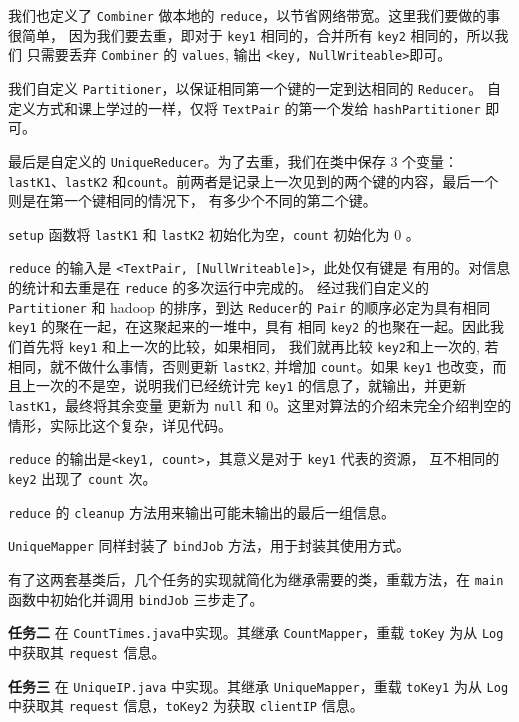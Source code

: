 \documentclass{article}
\begin{document}
  我们也定义了 \verb|Combiner| 做本地的 \verb|reduce|，以节省网络带宽。这里我们要做的事很简单，
  因为我们要去重，即对于 \verb|key1| 相同的，合并所有 \verb|key2| 相同的，所以我们
  只需要丢弃 \verb|Combiner| 的 \verb|values|, 输出 \verb|<key, NullWriteable>|即可。
  
  我们自定义 \verb|Partitioner|，以保证相同第一个键的一定到达相同的 \verb|Reducer|。
  自定义方式和课上学过的一样，仅将 \verb|TextPair| 的第一个发给 \verb|hashPartitioner| 即可。

  最后是自定义的 \verb|UniqueReducer|。为了去重，我们在类中保存 3 个变量：\verb|lastK1|、\verb|lastK2|
  和\verb|count|。前两者是记录上一次见到的两个键的内容，最后一个则是在第一个键相同的情况下，
  有多少个不同的第二个键。

  \verb|setup| 函数将 \verb|lastK1| 和 \verb|lastK2| 初始化为空，\verb|count| 初始化为 0 。

  \verb|reduce| 的输入是 \verb|<TextPair, [NullWriteable]>|，此处仅有键是
  有用的。对信息的统计和去重是在 \verb|reduce| 的多次运行中完成的。
  经过我们自定义的 \verb|Partitioner| 和 hadoop 的排序，到达 \verb|Reducer|的
  \verb|Pair| 的顺序必定为具有相同\verb|key1| 的聚在一起，在这聚起来的一堆中，具有
  相同 \verb|key2| 的也聚在一起。因此我们首先将 \verb|key1| 和上一次的比较，如果相同，
  我们就再比较 \verb|key2|和上一次的, 若相同，就不做什么事情，否则更新 \verb|lastK2|,
  并增加 \verb|count|。如果 \verb|key1| 也改变，而且上一次的不是空，说明我们已经统计完
  \verb|key1| 的信息了，就输出，并更新 \verb|lastK1|，最终将其余变量
  更新为 \verb|null| 和 0。这里对算法的介绍未完全介绍判空的情形，实际比这个复杂，详见代码。
  
  \verb|reduce| 的输出是\verb|<key1, count>|，其意义是对于 \verb|key1| 代表的资源，
  互不相同的 \verb|key2| 出现了 \verb|count| 次。

  \verb|reduce| 的 \verb|cleanup| 方法用来输出可能未输出的最后一组信息。

  \verb|UniqueMapper| 同样封装了 \verb|bindJob| 方法，用于封装其使用方式。

  有了这两套基类后，几个任务的实现就简化为继承需要的类，重载方法，在 \verb|main| 函数中初始化并调用
  \verb|bindJob| 三步走了。

  \textbf{任务二} 在 \verb|CountTimes.java|中实现。其继承 \verb|CountMapper|，重载 \verb|toKey| 为从
  \verb|Log| 中获取其 \verb|request| 信息。  
  
  \textbf{任务三} 在 \verb|UniqueIP.java| 中实现。其继承 \verb|UniqueMapper|，重载 \verb|toKey1| 为从
  \verb|Log| 中获取其 \verb|request| 信息，\verb|toKey2| 为获取 \verb|clientIP| 信息。
  
\end{document}
